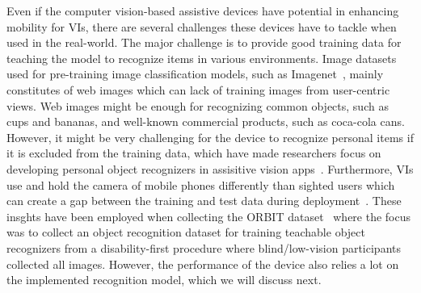 Even if the computer vision-based assistive devices have potential in enhancing mobility for VIs, there are several challenges these devices have to tackle when used in the real-world. The major challenge is to provide good training data for teaching the model to recognize items in various environments. Image datasets used for pre-training image classification models, such as Imagenet~\cite{deng2009imagenet}, mainly constitutes of web images which can lack of training images from user-centric views. Web images might be enough for recognizing common objects, such as cups and bananas, and well-known commercial products, such as coca-cola cans. However, it might be very challenging for the device to recognize personal items if it is excluded from the training data, which have made researchers focus on developing personal object recognizers in assisitive vision apps~\cite{ahmetovic2020recog, lee2019revisiting}. Furthermore, VIs use and hold the camera of mobile phones differently than sighted users which can create a gap between the training and test data during deployment~\cite{kacorri2017people, vazquez2012helping}. These insghts have been employed when collecting the ORBIT dataset~\cite{massiceti2021orbit} where the focus was to collect an object recognition dataset for training teachable object recognizers from a disability-first procedure where blind/low-vision participants collected all images\cite{theodorou2021disability}. However, the performance of the device also relies a lot on the implemented recognition model, which we will discuss next.

